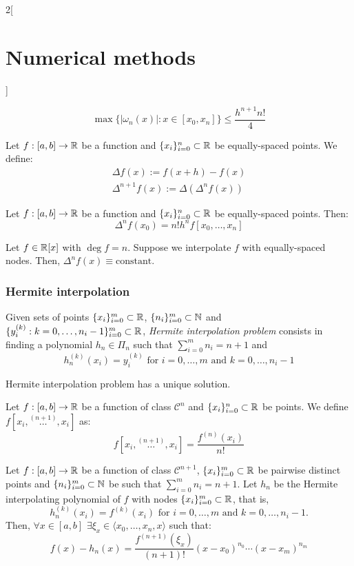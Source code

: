 \documentclass[../../../main.tex]{subfiles}
\begin{document}
\begin{multicols}{2}[\section{Numerical methods}]
\begin{prop}
        $$\max\{|\omega_n(x)|:x\in[x_0,x_n]\}\leq\frac{h^{n+1}n!}{4}$$
    \end{prop}
    \begin{definition}
        Let $f:[a,b]\rightarrow\mathbb{R}$ be a function and $\{x_i\}_{i=0}^n\subset\mathbb{R}$ be equally-spaced points. We define:
        \begin{gather*}
            \Delta f(x):=f(x+h)-f(x)\\
            \Delta^{n+1}f(x):=\Delta(\Delta^nf(x))
        \end{gather*}
    \end{definition}
    \begin{lemma}
        Let $f:[a,b]\rightarrow\mathbb{R}$ be a function and $\{x_i\}_{i=0}^n\subset\mathbb{R}$ be equally-spaced points. Then: $$\Delta^nf(x_0)=n!h^nf[x_0,\ldots,x_n]$$
    \end{lemma}
    \begin{corollary}
        Let $f\in\mathbb{R}[x]$ with $\deg f=n$. Suppose we interpolate $f$ with equally-spaced nodes. Then, $\Delta^nf(x)\equiv\text{constant}$.
    \end{corollary}
    \subsubsection*{Hermite interpolation}
    \begin{definition}
        Given sets of points $\{x_i\}_{i=0}^m\subset\mathbb{R}$, $\{n_i\}_{i=0}^m\subset\mathbb{N}$ and $\{y_i^{(k)}:k=0,\ldots,n_i-1\}_{i=0}^m\subset\mathbb{R}$, \textit{Hermite interpolation problem} consists in finding a polynomial $h_n\in\Pi_n$ such that $\sum_{i=0}^mn_i=n+1$ and $$h_n^{(k)}(x_i)=y_i^{(k)}\text{ for }i=0,\ldots,m\text{ and }k=0,\ldots,n_i-1$$
    \end{definition}
    \begin{prop}
        Hermite interpolation problem has a unique solution.
    \end{prop}
    \begin{definition}
        Let $f:[a,b]\rightarrow\mathbb{R}$ be a function of class $\mathcal{C}^n$ and $\{x_i\}_{i=0}^n\subset\mathbb{R}$ be points. We define $f[x_i,\overset{(n+1)}{\ldots},x_i]$ as: $$f[x_i,\overset{(n+1)}{\ldots},x_i]=\frac{f^{(n)}(x_i)}{n!}$$
    \end{definition}
    \begin{theorem}
        Let $f:[a,b]\rightarrow\mathbb{R}$ be a function of class $\mathcal{C}^{n+1}$, $\{x_i\}_{i=0}^m\subset\mathbb{R}$ be pairwise distinct points and $\{n_i\}_{i=0}^m\subset\mathbb{N}$ be such that $\sum_{i=0}^mn_i=n+1$. Let $h_n$ be the Hermite interpolating polynomial of $f$ with nodes $\{x_i\}_{i=0}^m\subset\mathbb{R}$, that is, $$h_n^{(k)}(x_i)=f^{(k)}(x_i)\text{ for }i=0,\ldots,m\text{ and }k=0,\ldots,n_i-1.$$ Then, $\forall x\in[a,b]$ $\exists\xi_x\in\langle x_0,\ldots,x_n,x\rangle$ such that: $$f(x)-h_n(x)=\frac{f^{(n+1)}(\xi_x)}{(n+1)!}(x-x_0)^{n_0}\cdots(x-x_m)^{n_m}$$
    \end{theorem}

\end{multicols}
\end{document}
